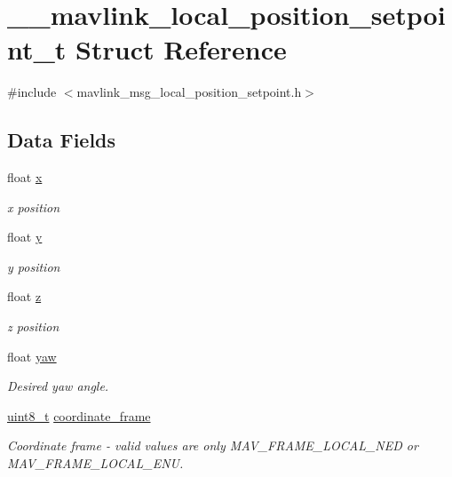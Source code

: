 \hypertarget{struct____mavlink__local__position__setpoint__t}{\section{\-\_\-\-\_\-mavlink\-\_\-local\-\_\-position\-\_\-setpoint\-\_\-t Struct Reference}
\label{struct____mavlink__local__position__setpoint__t}
}


{\ttfamily \#include $<$mavlink\-\_\-msg\-\_\-local\-\_\-position\-\_\-setpoint.\-h$>$}

\subsection*{Data Fields}
\begin{DoxyCompactItemize}
\item 
float \hyperlink{struct____mavlink__local__position__setpoint__t_a206e5fcf77dca173815edd4e9c5cfb2c}{x}
\begin{DoxyCompactList}\small\item\em x position \end{DoxyCompactList}\item 
float \hyperlink{struct____mavlink__local__position__setpoint__t_a99c553607e40da3cefd2d4221731c382}{y}
\begin{DoxyCompactList}\small\item\em y position \end{DoxyCompactList}\item 
float \hyperlink{struct____mavlink__local__position__setpoint__t_a3b95008f9ca33b3b1f0f23086dda34f2}{z}
\begin{DoxyCompactList}\small\item\em z position \end{DoxyCompactList}\item 
float \hyperlink{struct____mavlink__local__position__setpoint__t_a5fc83cf34d1de6841554d7413a9b3a86}{yaw}
\begin{DoxyCompactList}\small\item\em Desired yaw angle. \end{DoxyCompactList}\item 
\hyperlink{stdint_8h_aba7bc1797add20fe3efdf37ced1182c5}{uint8\-\_\-t} \hyperlink{struct____mavlink__local__position__setpoint__t_a1d1374da97eaf4caf6caa5fb431187ed}{coordinate\-\_\-frame}
\begin{DoxyCompactList}\small\item\em Coordinate frame -\/ valid values are only M\-A\-V\-\_\-\-F\-R\-A\-M\-E\-\_\-\-L\-O\-C\-A\-L\-\_\-\-N\-E\-D or M\-A\-V\-\_\-\-F\-R\-A\-M\-E\-\_\-\-L\-O\-C\-A\-L\-\_\-\-E\-N\-U. \end{DoxyCompactList}\end{DoxyCompactItemize}


